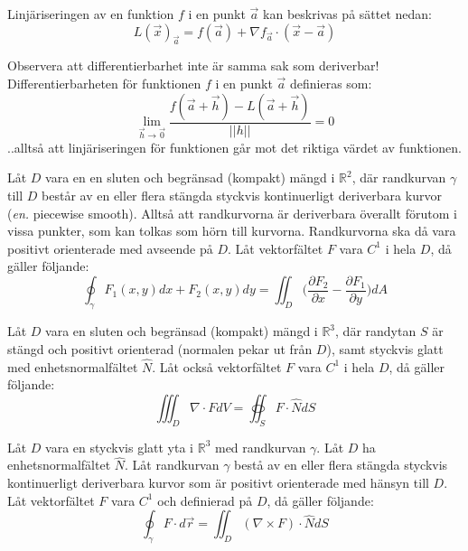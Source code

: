 \documentclass{report}
\begin{document}
{
Linjäriseringen av en funktion $f$ i en punkt $\vec{a}$ kan beskrivas på sättet nedan:
\begin{equation*}
	L(\vec{x})_{\vec{a}} = f(\vec{a}) + \nabla f_{\vec{a}} \cdot (\vec{x}-\vec{a})
\end{equation*}
}

{
Observera att differentierbarhet inte är samma sak som deriverbar! Differentierbarheten för funktionen $f$ i en punkt $\vec{a}$ definieras som:
\begin{equation*}
\lim_{\vec{h} \to \vec{0}} \frac{f(\vec{a}+\vec{h})-L(\vec{a}+\vec{h})}{||h||} = 0
\end{equation*}
..alltså att linjäriseringen för funktionen går mot det riktiga värdet av funktionen. 
}

{
	Låt $D$ vara en en sluten och begränsad (kompakt) mängd i $\mathbb{R}^2$, där randkurvan $\gamma$ till $D$ består av en eller flera stängda styckvis kontinuerligt deriverbara kurvor (\textit{en.} piecewise smooth). Alltså att randkurvorna är deriverbara överallt förutom i vissa punkter, som kan tolkas som hörn till kurvorna. Randkurvorna ska då vara positivt orienterade med avseende på $D$. Låt vektorfältet $F$ vara $C^1$ i hela $D$, då gäller följande:
	\begin{equation*}
		\oint_{\gamma} F_1(x,y)dx + F_2(x,y)dy = \iint_D \bigl(\frac{\partial F_2}{\partial x} - \frac{\partial F_1}{\partial y}\bigr) dA
	\end{equation*}
}	

{
	Låt $D$ vara en sluten och begränsad (kompakt) mängd i $\mathbb{R}^3$, där randytan $S$ är stängd och positivt orienterad (normalen pekar ut från $D$), samt styckvis glatt med enhetsnormalfältet $\hat{N}$. Låt också vektorfältet $F$ vara $C^1$ i hela $D$, då gäller följande:
	\begin{equation*}
		\iiint_D \nabla \cdot F dV = \oiint_S F \cdot \hat{N} dS
	\end{equation*}
}

{
	Låt $D$ vara en styckvis glatt yta i $\mathbb{R}^3$ med randkurvan $\gamma$. Låt $D$ ha enhetsnormalfältet $\hat{N}$. Låt randkurvan $\gamma$ bestå av en eller flera stängda styckvis kontinuerligt deriverbara kurvor som är positivt orienterade med hänsyn till $D$. Låt vektorfältet $F$ vara $C^1$ och definierad på $D$, då gäller följande:
	\begin{equation*}
		\oint_{\gamma} F \cdot d\vec{r} = \iint_D (\nabla \times F) \cdot \hat{N} dS
	\end{equation*}
}
\end{document}
